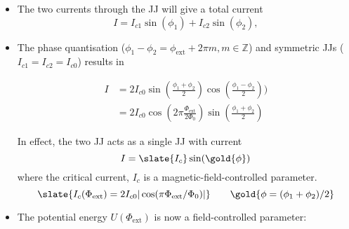 \begin{itemize}
\item  The   two  currents   through  the  JJ   will  give   a  total
  current \begin{equation} I = I_{c1}\sin(\phi_1)+I_{c2}\sin(\phi_2),
  \end{equation}

\item               The              phase               quantisation
  ($ \phi_1-\phi_2 = \phi_\text{ext} + 2\pi  m, m \in \mathbb{Z} $) and
  symmetric JJs ($I_{c1}=I_{c2}=I_{c0}$) results in

  \begin{equation}
    \begin{aligned}
      I & = 2I_{c0}\sin(\frac{\phi_1+\phi_2}{2})\cos(\frac{\phi_1-\phi_2}{2})) \\
      &                                                             =
      2I_{c0}\cos(2\pi\frac{\Phi_{\text{ext}}}{2\Phi_0})\sin(\frac{\phi_1+\phi_2}{2})
    \end{aligned}
  \end{equation}

\begin{framed}\noindent
  In effect, the two JJ acts as a single JJ with current
  \begin{equation}
    I = \slate{I_{c}}\sin(\gold{\phi})
  \end{equation}
  \noindent    where   the    critical    current,    $I_c$   is    a
  magnetic-field-controlled parameter.
  \begin{equation}
    \slate{I_{c}(\Phi_\text{ext}) = 2I_{c0}|\cos(\pi\Phi_\text{ext}/\Phi_0)|} \qquad \gold{\phi = (\phi_1+\phi_2)/2}
  \end{equation}

\end{framed}

\item   The  potential   energy  $U(\Phi_{\text{ext}})$   is  now   a
  field-controlled parameter:


\end{itemize}
